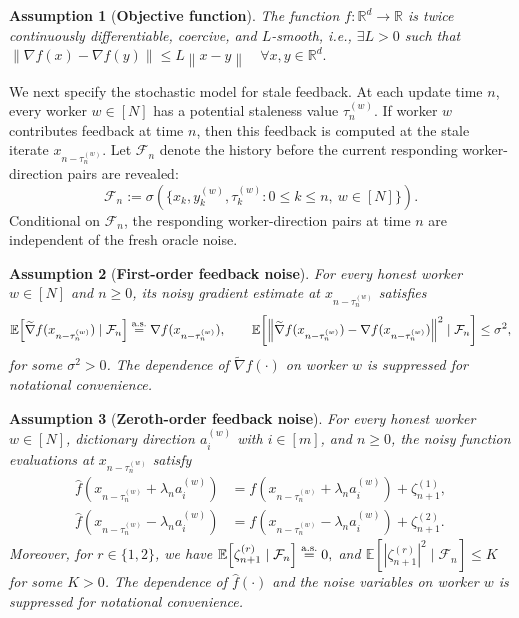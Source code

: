 \documentclass{article}
\newtheorem{assumption}{Assumption}
\newcommand{\norm}[1]{\left\lVert #1 \right\rVert}
\newcommand{\as}{\textnormal{a.s.}}
\newcommand{\bR}{\mathbb{R}}
\newcommand{\cF}{\mathcal{F}}
\begin{document}
%
\begin{assumption}[\textbf{Objective function}]
%
    \label{L-Smooth}
    The function $f: \bR^d \to \bR$ is twice continuously differentiable, coercive, and $L$-smooth, i.e., $\exists L > 0$ such that $    \norm{\nabla f(x)-\nabla f(y)} \leq L \norm{x-y} \quad \forall x , y \in \mathbb{R}^d.$
\end{assumption}

We next specify the stochastic model for stale feedback. At each update time
$n$, every worker $w\in[N]$ has a potential staleness value $\tau_n^{(w)}$.
If worker $w$ contributes feedback at time $n$, then this feedback is computed
at the stale iterate $x_{n-\tau_n^{(w)}}$. Let $\cF_n$ denote the history before
the current responding worker-direction pairs are revealed:
\begin{equation}
\label{e:filtration.defn}
    \cF_n
    :=
    \sigma\!\left(
    \{x_k, y_k^{(w)}, \tau_k^{(w)}:0\le k\le n,\ w\in[N]\}
    \right).
\end{equation}
Conditional on $\cF_n$, the responding worker-direction pairs at time $n$ are
independent of the fresh oracle noise. 

    \begin{assumption}[\textbf{First-order feedback noise}]
    \label{noise-first order}
        For every honest worker $w \in[N]$ and $n\ge0$, its noisy gradient estimate at     $x_{n-\tau_n^{(w)}}$ satisfies
        \[
        \mathbb{E}\!\left[    \widetilde{\nabla}f(x_{n-\tau_n^{(w)}})\mid\cF_n     \right]     \overset{\as}{=}     \nabla f(x_{n-\tau_n^{(w)}}),\qquad     \mathbb{E}\!\left[\left\|   \widetilde{\nabla}f(x_{n-\tau_n^{(w)}}) - \nabla f(x_{n-\tau_n^{(w)}}) \right\|^2    \mid\cF_n    \right] \le \sigma^2,
    \]
    for some $\sigma^2>0$. The dependence of
    $\widetilde{\nabla}f(\cdot)$ on worker $w$ is suppressed for notational
    convenience.
    \end{assumption}

    \begin{assumption}[\textbf{Zeroth-order feedback noise}]
    \label{noise-assump}
        For every honest worker $w \in[N]$, dictionary direction $a_i^{(w)}$ with $i\in[m]$, and $n\ge0$, the noisy function evaluations at $x_{n-\tau_n^{(w)}}$ satisfy
        \[
            \begin{aligned}
            \widehat f(x_{n-\tau_n^{(w)}}+\lambda_n a_i^{(w)})
            &=
            f(x_{n-\tau_n^{(w)}}+\lambda_n a_i^{(w)})+\zeta_{n+1}^{(1)},\\
            \widehat f(x_{n-\tau_n^{(w)}}-\lambda_n a_i^{(w)})
            &=
            f(x_{n-\tau_n^{(w)}}-\lambda_n a_i^{(w)})+\zeta_{n+1}^{(2)}.
            \end{aligned}
            \]
            Moreover, for $r\in\{1,2\}$, we have $\mathbb E\!\left[\zeta_{n+1}^{(r)}\mid\cF_n\right]\overset{\as}{=}0,$ and $
            \mathbb E\!\left[|\zeta_{n+1}^{(r)}|^2\mid\cF_n\right]\le K$ 
        for some $K>0$. The dependence of $\widehat f(\cdot)$ and the noise variables
        on worker $w$ is suppressed for notational convenience.
    \end{assumption}
\end{document}
